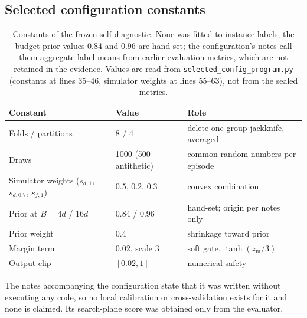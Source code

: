 \documentclass{article}
\begin{document}
\subsection{Selected configuration constants}
\begin{table}[h]
\centering
\caption{Constants of the frozen self-diagnostic. None was fitted to instance labels; the budget-prior values 0.84 and 0.96 are hand-set; the configuration's notes call them aggregate label means from earlier evaluation metrics, which are not retained in the evidence. Values are read from \texttt{selected\_config\_program.py} (constants at lines 35--46, simulator weights at lines 55--63), not from the sealed metrics.}
\label{tab:consts}
\small
\begin{tabular}{lll}
\toprule
Constant & Value & Role \\
\midrule
Folds / partitions & 8 / 4 & delete-one-group jackknife, averaged \\
Draws & 1000 (500 antithetic) & common random numbers per episode \\
Simulator weights ($s_{d,1}$, $s_{d,0.7}$, $s_{f,1}$) & 0.5, 0.2, 0.3 & convex combination \\
Prior at $B=4d$ / $16d$ & 0.84 / 0.96 & hand-set; origin per notes only \\
Prior weight & 0.4 & shrinkage toward prior \\
Margin term & 0.02, scale 3 & soft gate, $\tanh(z_{\mathrm m}/3)$ \\
Output clip & $[0.02,1]$ & numerical safety \\
\bottomrule
\end{tabular}
\end{table}
The notes accompanying the configuration state that it was written without executing any code, so no local calibration or cross-validation exists for it and none is claimed. Its search-plane score was obtained only from the evaluator.
\end{document}
